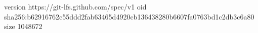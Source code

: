 version https://git-lfs.github.com/spec/v1
oid sha256:b62916762c55ddd2fab63465d4920cb136438280b6607fa0763bd1c2db3c6a80
size 1048672
